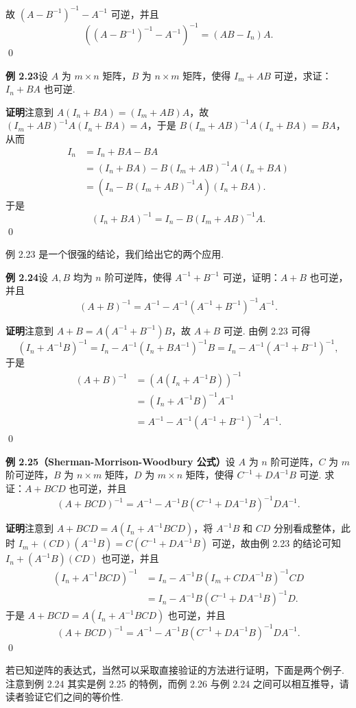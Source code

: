 \documentclass[UTF8, 12pt, fontset=fandol, oneside]{ctexart}
\begin{document}
故 $(A-B^{-1})^{-1}-A^{-1}$ 可逆，并且
\[
\left((A-B^{-1})^{-1}-A^{-1}\right)^{-1}=(AB-I_n)A.
\]
\qed

\noindent\textbf{例 2.23}\quad 设 $A$ 为 $m\times n$ 矩阵，$B$ 为 $n\times m$ 矩阵，使得 $I_m+AB$ 可逆，求证：$I_n+BA$ 也可逆.

\noindent\textbf{证明}\quad 注意到 $A(I_n+BA)=(I_m+AB)A$，故 $(I_m+AB)^{-1}A(I_n+BA)=A$，于是 $B(I_m+AB)^{-1}A(I_n+BA)=BA$，从而
\[
\begin{aligned}
I_n
&=I_n+BA-BA\\
&=(I_n+BA)-B(I_m+AB)^{-1}A(I_n+BA)\\
&=(I_n-B(I_m+AB)^{-1}A)(I_n+BA).
\end{aligned}
\]
于是
\[
(I_n+BA)^{-1}=I_n-B(I_m+AB)^{-1}A.
\]
\qed

例 2.23 是一个很强的结论，我们给出它的两个应用.

\noindent\textbf{例 2.24}\quad 设 $A,B$ 均为 $n$ 阶可逆阵，使得 $A^{-1}+B^{-1}$ 可逆，证明：$A+B$ 也可逆，并且
\[
(A+B)^{-1}=A^{-1}-A^{-1}(A^{-1}+B^{-1})^{-1}A^{-1}.
\]

\noindent\textbf{证明}\quad 注意到 $A+B=A(A^{-1}+B^{-1})B$，故 $A+B$ 可逆. 由例 2.23 可得
\[
(I_n+A^{-1}B)^{-1}
=I_n-A^{-1}(I_n+BA^{-1})^{-1}B
=I_n-A^{-1}(A^{-1}+B^{-1})^{-1},
\]
于是
\[
\begin{aligned}
(A+B)^{-1}
&=(A(I_n+A^{-1}B))^{-1}\\
&=(I_n+A^{-1}B)^{-1}A^{-1}\\
&=A^{-1}-A^{-1}(A^{-1}+B^{-1})^{-1}A^{-1}.
\end{aligned}
\]
\qed

\noindent\textbf{例 2.25（Sherman-Morrison-Woodbury 公式）}\quad 设 $A$ 为 $n$ 阶可逆阵，$C$ 为 $m$ 阶可逆阵，$B$ 为 $n\times m$ 矩阵，$D$ 为 $m\times n$ 矩阵，使得 $C^{-1}+DA^{-1}B$ 可逆. 求证：$A+BCD$ 也可逆，并且
\[
(A+BCD)^{-1}=A^{-1}-A^{-1}B(C^{-1}+DA^{-1}B)^{-1}DA^{-1}.
\]

\noindent\textbf{证明}\quad 注意到 $A+BCD=A(I_n+A^{-1}BCD)$，将 $A^{-1}B$ 和 $CD$ 分别看成整体，此时 $I_m+(CD)(A^{-1}B)=C(C^{-1}+DA^{-1}B)$ 可逆，故由例 2.23 的结论可知 $I_n+(A^{-1}B)(CD)$ 也可逆，并且
\[
\begin{aligned}
(I_n+A^{-1}BCD)^{-1}
&=I_n-A^{-1}B(I_m+CDA^{-1}B)^{-1}CD\\
&=I_n-A^{-1}B(C^{-1}+DA^{-1}B)^{-1}D.
\end{aligned}
\]
于是 $A+BCD=A(I_n+A^{-1}BCD)$ 也可逆，并且
\[
(A+BCD)^{-1}=A^{-1}-A^{-1}B(C^{-1}+DA^{-1}B)^{-1}DA^{-1}.
\]
\qed

若已知逆阵的表达式，当然可以采取直接验证的方法进行证明，下面是两个例子. 注意到例 2.24 其实是例 2.25 的特例，而例 2.26 与例 2.24 之间可以相互推导，请读者验证它们之间的等价性.
\end{document}
